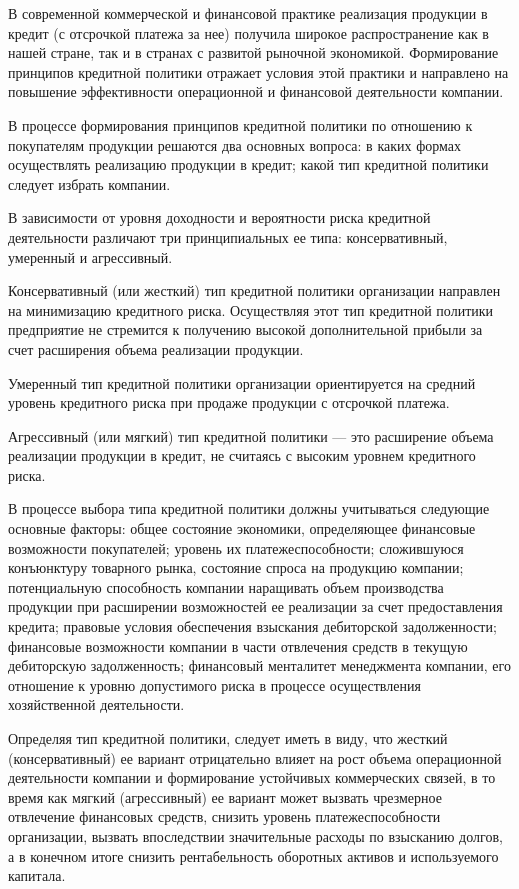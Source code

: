В современной коммерческой и финансовой практике реализация продукции в кредит (с отсрочкой платежа за нее) получила широкое распространение как в нашей стране, так и в странах с развитой рыночной экономикой.
Формирование принципов кредитной политики отражает условия этой практики и направлено на повышение эффективности операционной и финансовой деятельности компании.

В процессе формирования принципов кредитной политики по отношению к покупателям продукции решаются два основных вопроса: в каких формах осуществлять реализацию продукции в кредит; какой тип кредитной политики следует избрать компании.

В зависимости от уровня доходности и вероятности риска кредитной деятельности различают три принципиальных ее типа: консервативный, умеренный и агрессивный.

Консервативный (или жесткий) тип кредитной политики организации направлен на минимизацию кредитного риска.
Осуществляя этот тип кредитной политики предприятие не стремится к получению высокой дополнительной прибыли за счет расширения объема реализации продукции.

Умеренный тип кредитной политики организации ориентируется на средний уровень кредитного риска при продаже продукции с отсрочкой платежа.

Агрессивный (или мягкий) тип кредитной политики --- это расширение объема реализации продукции в кредит, не считаясь с высоким уровнем кредитного риска.

В процессе выбора типа кредитной политики должны учитываться следующие основные факторы: общее состояние экономики, определяющее финансовые возможности покупателей;
уровень их платежеспособности; сложившуюся конъюнктуру товарного рынка, состояние спроса на продукцию компании; потенциальную способность компании наращивать объем производства продукции при расширении возможностей ее реализации за счет предоставления кредита; правовые условия обеспечения взыскания дебиторской задолженности; финансовые возможности компании в части отвлечения средств в текущую дебиторскую задолженность; финансовый менталитет менеджмента компании, его отношение к уровню допустимого риска в процессе осуществления хозяйственной деятельности.

Определяя тип кредитной политики, следует иметь в виду, что жесткий (консервативный) ее вариант отрицательно влияет на рост объема операционной деятельности компании и формирование устойчивых коммерческих связей, в то время как мягкий (агрессивный) ее вариант может вызвать чрезмерное отвлечение финансовых средств, снизить уровень платежеспособности организации, вызвать впоследствии значительные расходы по взысканию долгов, а в конечном итоге снизить рентабельность оборотных активов и используемого капитала.

